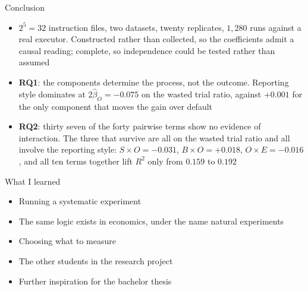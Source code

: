 \documentclass[aspectratio=169,11pt]{beamer}
\begin{document}
\begin{frame}{Conclusion}
  \small
  \begin{itemize}
    \item $2^5 = 32$ instruction files, two datasets, twenty replicates,
          $1{,}280$ runs against a real executor. Constructed rather than
          collected, so the coefficients admit a causal reading; complete, so
          independence could be tested rather than assumed
    \item \textbf{RQ1}: the components determine the process, not the outcome.
          Reporting style dominates at $2\hat\beta_O = -0.075$ on the wasted
          trial ratio, against $+0.001$ for the only component that moves the
          gain over default
    \item \textbf{RQ2}: thirty seven of the forty pairwise terms show no
          evidence of interaction. The three that survive are all on the wasted
          trial ratio and all involve the reporting style:
          $S\times O = -0.031$, $B\times O = +0.018$, $O\times E = -0.016$, and
          all ten terms together lift $R^2$ only from $0.159$ to $0.192$
  \end{itemize}
\end{frame}

\begin{frame}{What I learned}
  \vfill
  \begin{itemize}\itemsep0.55em
    \item Running a systematic experiment
    \item The same logic exists in economics, under the name natural experiments
    \item Choosing what to measure
    \item The other students in the research project
    \item Further inspiration for the bachelor thesis
  \end{itemize}
  \vfill
\end{frame}
\end{document}
